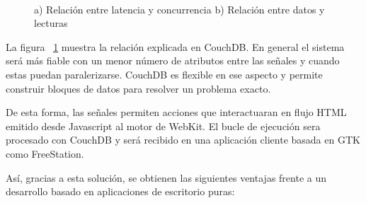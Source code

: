 \begin{figure}[ht!]
   \centering
   \hspace{0.1\linewidth}
   \\[20pt]
        \caption{a) Relación entre latencia y concurrencia b) Relación entre datos y
    lecturas}
   \label{fig:relationscouch}    
\end{figure}

\newpage

La figura ~\ref{fig:relationscouch} muestra la relación explicada en CouchDB. En
general el sistema será más fiable con un menor número de atributos entre las
señales y cuando estas puedan paralerizarse. CouchDB es flexible en 
ese aspecto y permite construir bloques de datos para resolver un problema
exacto.

De esta forma, las señales permiten acciones que interactuaran en flujo HTML
emitido desde Javascript al motor de WebKit. El bucle de ejecución sera
procesado con CouchDB y será recibido en una aplicación cliente basada en
GTK como FreeStation.

Así, gracias a esta solución, se obtienen las siguientes ventajas frente a un 
desarrollo basado en aplicaciones de escritorio puras:


